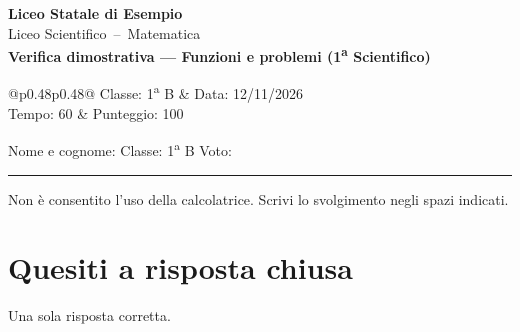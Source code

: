 \documentclass[11pt,a4paper]{article}
\makeatletter
\newcommand{\intestazione}[8]{%
  \begin{center}
    {\large\bfseries #1}\\[1mm]
    {\small #2\ --\ #3}\\[3mm]
    {\Large\bfseries #4}\\[3mm]
    \begin{tabular}{@{}p{0.48\textwidth}p{0.48\textwidth}@{}}
      Classe: #5 & Data: #6 \\
      Tempo: #7 & Punteggio: #8 \\
    \end{tabular}
  \end{center}
}
\newcommand{\titolosezione}[1]{\par\needspace{4\baselineskip}\section*{#1}\vspace{-1mm}}
\makeatother
\begin{document}

\intestazione{Liceo Statale di Esempio}{Liceo Scientifico}{Matematica}{Verifica dimostrativa --- Funzioni e problemi (1\textsuperscript{a} Scientifico)}{1\textsuperscript{a} B}{12/11/2026}{60}{100}




\noindent Nome e cognome: \dotfill \hfill Classe: 1\textsuperscript{a} B \hfill Voto: \dotfill
\par\vspace{1mm}
\noindent\rule{\linewidth}{0.4pt}
\par\vspace{1mm}

\noindent\small Non è consentito l'uso della calcolatrice. Scrivi lo svolgimento negli spazi indicati.\par\vspace{2mm}



\titolosezione{Quesiti a risposta chiusa}

\noindent\small Una sola risposta corretta.\par\vspace{1mm}
\end{document}
